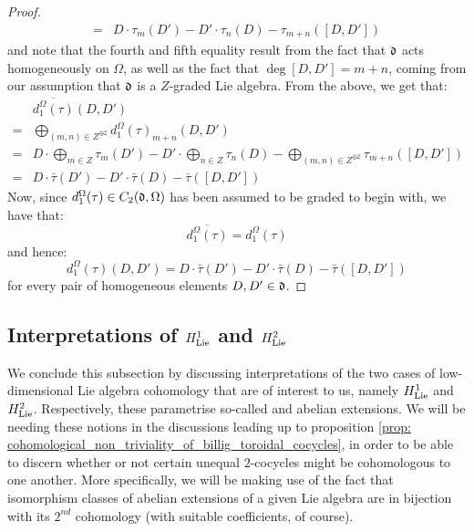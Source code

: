 \begin{proof}
$$\begin{aligned}
                            = & D \cdot \tau_m(D') - D' \cdot \tau_n(D) - \tau_{m + n}([D, D'])
                        \end{aligned}
                    $$
                and note that the fourth and fifth equality result from the fact that $\mathfrak{d}$ acts homogeneously on $\Omega$, as well as the fact that $\deg [D, D'] = m + n$, coming from our assumption that $\mathfrak{d}$ is a $Z$-graded Lie algebra. From the above, we get that:
                    $$
                        \begin{aligned}
                            & \overline{d_1^{\Omega}(\tau)}(D, D')
                            \\
                            = & \bigoplus_{(m, n) \in Z^{\oplus 2} } d_1^{\Omega}(\tau)_{m + n}(D, D')
                            \\
                            = & D \cdot \bigoplus_{m \in Z} \tau_m(D') - D' \cdot \bigoplus_{n \in Z} \tau_n(D) - \bigoplus_{(m, n) \in Z^{\oplus 2} } \tau_{m + n}([D, D'])
                            \\
                            = & D \cdot \bar{\tau}(D') - D' \cdot \bar{\tau}(D) - \bar{\tau}([D, D'])
                        \end{aligned}
                    $$
                Now, since $d_1^{\Omega}(\tau) \in C_2(\mathfrak{d}, \Omega)$ has been assumed to be graded to begin with, we have that:
                    $$\overline{d_1^{\Omega}(\tau)} = d_1^{\Omega}(\tau)$$
                and hence:
                    $$d_1^{\Omega}(\tau)(D, D') = D \cdot \bar{\tau}(D') - D' \cdot \bar{\tau}(D) - \bar{\tau}([D, D'])$$
                for every pair of homogeneous elements $D, D' \in \mathfrak{d}$. 
            \end{proof}

    \subsection{Interpretations of \texorpdfstring{$H^1_{\mathrm{Lie}}$}{} and \texorpdfstring{$H^2_{\mathrm{Lie}}$}{}}
        We conclude this subsection by discussing interpretations of the two cases of low-dimensional Lie algebra cohomology that are of interest to us, namely $H^1_{\mathrm{Lie}}$ and $H^2_{\mathrm{Lie}}$. Respectively, these parametrise so-called  and abelian extensions. We will be needing these notions in the discussions leading up to proposition \ref{prop: cohomological_non_triviality_of_billig_toroidal_cocycles}, in order to be able to discern whether or not certain unequal $2$-cocycles might be cohomologous to one another. More specifically, we will be making use of the fact that isomorphism classes of abelian extensions of a given Lie algebra are in bijection with its $2^{nd}$ cohomology (with suitable coefficients, of course).
        
